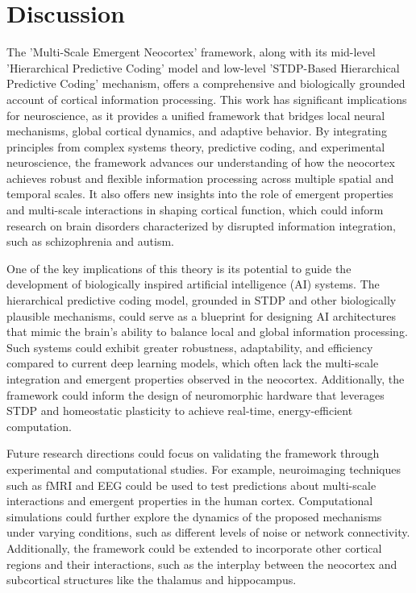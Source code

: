 \documentclass{article}
\begin{document}
\section{Discussion}
The 'Multi-Scale Emergent Neocortex' framework, along with its mid-level 'Hierarchical Predictive Coding' model and low-level 'STDP-Based Hierarchical Predictive Coding' mechanism, offers a comprehensive and biologically grounded account of cortical information processing. This work has significant implications for neuroscience, as it provides a unified framework that bridges local neural mechanisms, global cortical dynamics, and adaptive behavior. By integrating principles from complex systems theory, predictive coding, and experimental neuroscience, the framework advances our understanding of how the neocortex achieves robust and flexible information processing across multiple spatial and temporal scales. It also offers new insights into the role of emergent properties and multi-scale interactions in shaping cortical function, which could inform research on brain disorders characterized by disrupted information integration, such as schizophrenia and autism.

One of the key implications of this theory is its potential to guide the development of biologically inspired artificial intelligence (AI) systems. The hierarchical predictive coding model, grounded in STDP and other biologically plausible mechanisms, could serve as a blueprint for designing AI architectures that mimic the brain's ability to balance local and global information processing. Such systems could exhibit greater robustness, adaptability, and efficiency compared to current deep learning models, which often lack the multi-scale integration and emergent properties observed in the neocortex. Additionally, the framework could inform the design of neuromorphic hardware that leverages STDP and homeostatic plasticity to achieve real-time, energy-efficient computation.

Future research directions could focus on validating the framework through experimental and computational studies. For example, neuroimaging techniques such as fMRI and EEG could be used to test predictions about multi-scale interactions and emergent properties in the human cortex. Computational simulations could further explore the dynamics of the proposed mechanisms under varying conditions, such as different levels of noise or network connectivity. Additionally, the framework could be extended to incorporate other cortical regions and their interactions, such as the interplay between the neocortex and subcortical structures like the thalamus and hippocampus.
\end{document}
